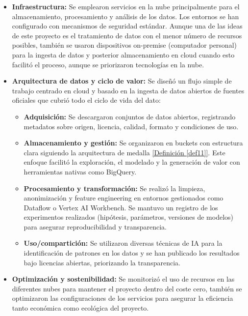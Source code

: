 \begin{itemize}
	\item \textbf{Infraestructura:} Se emplearon servicios en la nube principalmente para el almacenamiento, procesamiento y análisis de los datos. Los entornos se han configurado con mecanismos de seguridad estándar. Aunque una de las ideas de este proyecto es el tratamiento de datos con el menor número de recursos posibles, también se usaron dispositivos on-premise (computador personal) para la ingesta de datos y posterior almacenamiento en cloud cuando esto facilitó el proceso, aunque se priorizaron tecnologías en la nube.
	
	\item \textbf{Arquitectura de datos y ciclo de valor:} Se diseñó un flujo simple de trabajo centrado en cloud y basado en la ingesta de datos abiertos de fuentes oficiales que cubrió todo el ciclo de vida del dato: 
	\begin{itemize}
		\item \textbf{Adquisición:} Se descargaron conjuntos de datos abiertos, registrando metadatos sobre origen, licencia, calidad, formato y condiciones de uso. 
		
		\item \textbf{Almacenamiento y gestión:} Se organizaron en buckets con estructura clara siguiendo la arquitectura de medalla \hyperref[def11]{[Definición \ref*{def11}]}. Este enfoque facilitó la exploración, el modelado y la generación de valor con herramientas nativas como BigQuery.
		
		\item \textbf{Procesamiento y transformación:} Se realizó la limpieza, anonimización y feature engineering en entornos gestionados como Dataflow o Vertex AI Workbench. Se mantuvo un registro de los experimentos realizados (hipótesis, parámetros, versiones de modelos) para asegurar reproducibilidad y transparencia.
		
		\item \textbf{Uso/compartición:} Se utilizaron diversas técnicas de IA para la identificación de patrones en los datos y se han publicado los resultados bajo licencias abiertas, priorizando la transparencia.
		
	\end{itemize}
	
	\item \textbf{Optimización y sostenibilidad:} Se monitorizó el uso de recursos en las diferentes nubes para mantener el proyecto dentro del coste cero, también se optimizaron las configuraciones de los servicios para asegurar la eficiencia tanto económica como ecológica del proyecto.
\end{itemize}

